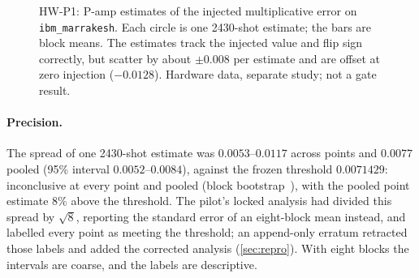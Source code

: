 \documentclass[10pt,twocolumn]{article}
\theoremstyle{definition}
\theoremstyle{remark}
\newcommand{\eps}{\epsilon}
\begin{document}
\begin{figure}[t]
\centering
{}
\caption{HW-P1: P-amp estimates of the injected multiplicative error on \texttt{ibm\_marrakesh}. Each circle is one 2430-shot estimate; the bars are block means. The estimates track the injected value and flip sign correctly, but scatter by about $\pm0.008$ per estimate and are offset at zero injection ($-0.0128$). Hardware data, separate study; not a gate result.}
\label{fig:hw}
\end{figure}

\paragraph{Precision.} The spread of one 2430-shot estimate was $0.0053$--$0.0117$ across points and $0.0077$ pooled (95\% interval $0.0052$--$0.0084$), against the frozen threshold $0.0071429$: inconclusive at every point and pooled (block bootstrap~\cite{efron1979}), with the pooled point estimate 8\% above the threshold. The pilot's locked analysis had divided this spread by $\sqrt8$, reporting the standard error of an eight-block mean instead, and labelled every point as meeting the threshold; an append-only erratum retracted those labels and added the corrected analysis (\cref{sec:repro}). With eight blocks the intervals are coarse, and the labels are descriptive.
\end{document}
